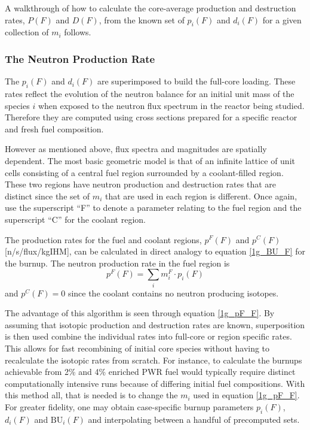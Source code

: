A walkthrough of how to calculate the core-average production and destruction rates, $P(F)$ and $D(F)$, 
from the known set of $p_i(F)$ and $d_i(F)$ for a given collection of $m_i$ follows.  




\subsubsection{The Neutron Production Rate}
\label{1g_sec:p_rate}
The $p_i(F)$ and $d_i(F)$ are superimposed to build the full-core loading.  These rates reflect the 
evolution of the neutron balance for an initial unit mass of the species $i$ when exposed to the 
neutron flux spectrum in the reactor being studied.  Therefore they are computed using cross 
sections prepared for a specific reactor and fresh fuel composition.

However as mentioned above, flux spectra and magnitudes are spatially dependent.  The most basic geometric 
model is that of an infinite lattice of unit cells consisting of a central fuel region 
surrounded by a coolant-filled region.  These two regions have neutron production and destruction rates that 
are distinct since the set of $m_i$ that are used in each region is different.  Once again, use the 
superscript ``F'' to denote a parameter relating to the fuel region and the superscript ``C'' for the coolant 
region. 

The production rates for the fuel and coolant regions, $p^F(F)$ and $p^C(F)$ [n/s/flux/kgIHM], 
can be calculated in direct analogy to equation \ref{1g_BU_F} for the burnup.  The neutron production 
rate in the fuel region is 
\begin{equation}
\label{1g_pF_F}
p^F(F) = \sum_i m_i^F \cdot p_i(F)
\end{equation}
and $p^C(F) = 0$ since the coolant contains no neutron producing isotopes.  

The advantage of this algorithm is seen through equation \ref{1g_pF_F}.  By assuming that isotopic 
production and destruction rates are known, superposition is then used combine the individual rates 
into full-core or region specific rates.  This allows for fast recombining of initial core species without 
having to recalculate the isotopic rates from scratch.  For instance, to calculate the burnups achievable 
from 2\% and 4\%  enriched PWR fuel would typically require distinct computationally intensive 
runs because of differing initial fuel compositions.  With this method all, that is needed is to change the 
$m_i$ used in equation \ref{1g_pF_F}.   For greater fidelity, one may obtain case-specific burnup parameters $p_i(F)$, 
$d_i(F)$ and $\mbox{BU}_i(F)$ and interpolating between a handful of precomputed sets.  

